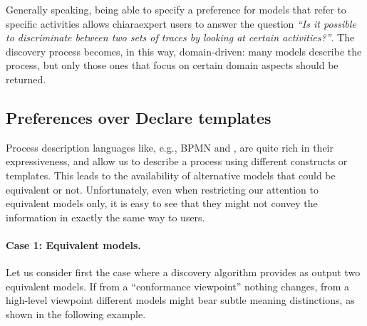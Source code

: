 Generally speaking, being able to specify a preference for models that refer to specific activities allows chiara{expert} users to answer the question \emph{``Is it possible to discriminate between two sets of traces by looking at certain activities?''}. The discovery process becomes, in this way, domain-driven: many models describe the process, but only those ones that focus on certain domain aspects should be returned. %




\subsection{Preferences over Declare templates}
\label{subsec:prefOverTemplates}

Process description languages like, e.g., BPMN and \declare, are quite rich in their expressiveness, and allow us to describe a process using different constructs or templates. This leads to the availability of alternative models that could be equivalent or not. Unfortunately, even when restricting our attention to equivalent models only, it is easy to see that they might not convey the information in exactly the same way to users.


\paragraph{Case 1: Equivalent models.} Let us consider first the %
 case where a discovery algorithm provides as %
 output two equivalent models. If from a ``conformance viewpoint'' nothing changes, from a high-level viewpoint different models might bear subtle meaning distinctions, as shown in the following example.

